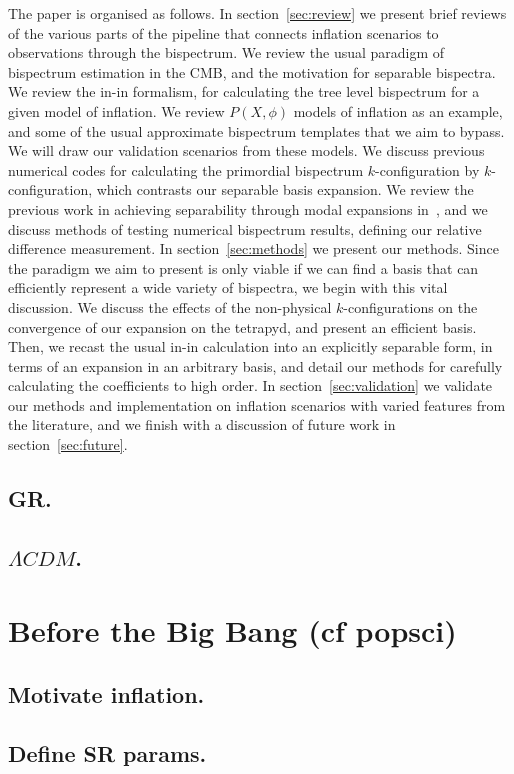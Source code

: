 The paper is organised as follows. In section~\ref{sec:review} we present brief reviews
of the various parts of the pipeline that connects inflation scenarios to observations
through the bispectrum.
We review the usual paradigm of bispectrum estimation in the CMB,
and the motivation for separable bispectra. We review the in-in formalism,
for calculating the tree level bispectrum for a given model of inflation.
We review $P(X,\phi)$ models of inflation as an example, and
some of the usual approximate bispectrum templates
that we aim to bypass.
We will draw our validation scenarios from these models.
We discuss previous numerical codes for
calculating the primordial bispectrum $k$-configuration by $k$-configuration,
which contrasts our separable basis expansion.
We review the previous work in achieving separability through modal expansions
in~\cite{Funakoshi},
and we discuss methods of testing
numerical bispectrum results, defining our relative difference measurement.
In section~\ref{sec:methods} we present our methods.
Since the paradigm we aim to present is only viable if we can find a basis
that can efficiently represent a wide variety of bispectra,
we begin with this vital discussion. We discuss the effects of the
non-physical $k$-configurations on the convergence of our expansion on
the tetrapyd, and present an efficient basis.
Then, we recast the usual in-in calculation into an explicitly separable form,
in terms of an expansion in an arbitrary basis,
and detail our methods for carefully calculating the coefficients to high order.
In section~\ref{sec:validation} we validate our methods and implementation
on inflation scenarios with varied features from the literature,
and we finish with a discussion of future work in section~\ref{sec:future}.
    \subsection{GR.}
    \subsection{$\Lambda CDM$.}
\section{Before the Big Bang (cf popsci)}
    \subsection{Motivate inflation.}
    \subsection{Define SR params.}
